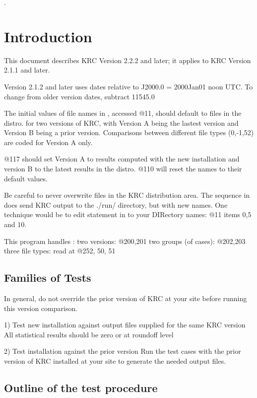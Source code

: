 \documentclass{article}  %
\begin{document}
\hrulefill .\hrulefill

\section{Introduction} 
This document describes KRC Version 2.2.2 and later; it applies to KRC Version
2.1.1 and later.

Version 2.1.2 and later uses dates relative to J2000.0 = 2000Jan01 noon UTC. To
change from older version dates, subtract 11545.0

The initial values of file names in , accessed @11, should default to
files in the distro. for two versions of KRC, with Version A being the lastest
version and Version B being a prior version.  Comparisons between different file
types (0,-1,52) are coded for Version A only.

 @117 should set Version A to results computed with the new installation and
 version B to the latest results in the distro. @110 will reset the names to
 their default values.

Be careful to never overwrite files in the KRC distribution area. The sequence
in  does send KRC output to the ./run/ directory, but with new
names. One technique would be to edit \nv{parf=[...} statement in
   to your DIRectory names: @11 items 0,5 and 10.

This program handles :
\qi two versions:   @200,201
\qi two groups (of cases): @202,203
\qi three file types: read at @252, 50, 51

\subsection{Families of Tests}

\Large
In general, do not override the prior version of KRC at your site before running this version comparison.
\normalsize

1) Test new installation against output files supplied for the same KRC version
\qi All statistical results should be zero or at roundoff level

2) Test installation against the prior version
\qi Run the test cases with the prior version of KRC installed at your site to generate the needed output files.


\subsection{Outline of the test procedure}
\end{document}
